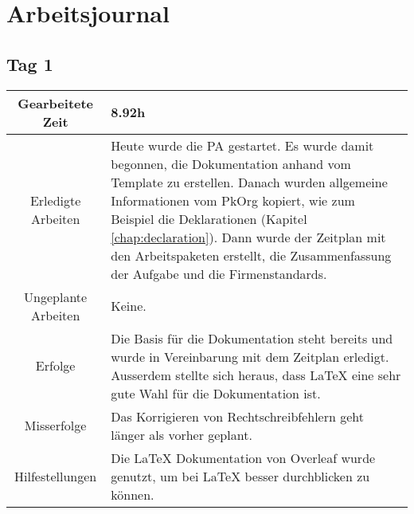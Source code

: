 \chapter{Arbeitsjournal}

\section{Tag 1}
\begin{tabularx}{\textwidth}[H]{|c|X|}
  \hline
  Gearbeitete Zeit & 8.92h \\ \hline
  Erledigte Arbeiten & Heute wurde die PA gestartet. Es wurde damit begonnen, die Dokumentation anhand vom Template
  \cite{Buhler_ipa-template_2022} zu erstellen. Danach wurden allgemeine Informationen vom PkOrg kopiert, wie zum
  Beispiel die Deklarationen (Kapitel \ref{chap:declaration}).
  Dann wurde der Zeitplan mit den Arbeitspaketen erstellt, die Zusammenfassung der Aufgabe und die
  Firmenstandards. \\ \hline
  Ungeplante Arbeiten & Keine. \\ \hline
  Erfolge & Die Basis für die Dokumentation steht bereits und wurde in Vereinbarung mit dem Zeitplan erledigt. Ausserdem stellte
  sich heraus, dass LaTeX eine sehr gute Wahl für die Dokumentation ist.
  \\ \hline
  Misserfolge & Das Korrigieren von Rechtschreibfehlern geht länger als vorher geplant.  \\ \hline
  Hilfestellungen & Die LaTeX Dokumentation von Overleaf \cite{overleaf} wurde genutzt, um bei LaTeX besser durchblicken zu
  können. \\ \hline
\end{tabularx}

\newpage

